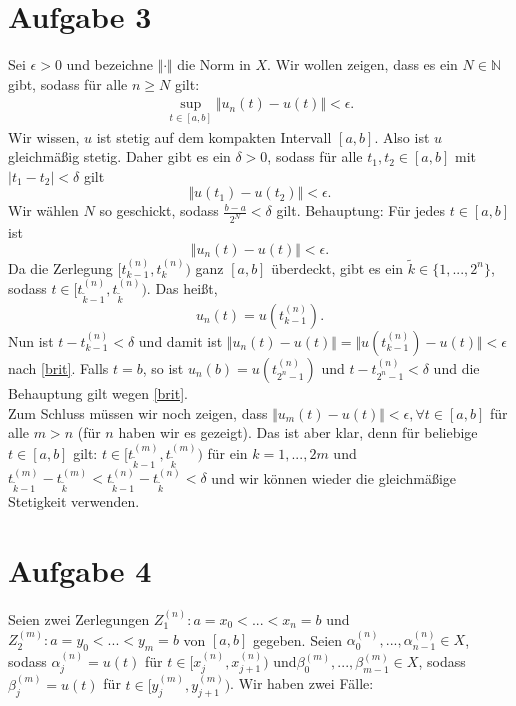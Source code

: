 \documentclass[a4paper,fontsize=8pt,DIV=1]{article}
\theoremstyle{plain}
\begin{document}
\section*{Aufgabe 3}
Sei $\epsilon > 0$ und bezeichne $\Vert \cdot \Vert$ die Norm in $X$. Wir wollen zeigen, dass es ein $N \in \mathbb N$ gibt, sodass für alle $n \geq N$ gilt:
\begin{align}\label{brit}
	\sup_{t \in [a,b]}\Vert u_n(t) - u(t) \Vert < \epsilon.
\end{align}
Wir wissen, $u$ ist stetig auf dem kompakten Intervall $[a,b]$. Also ist $u$ gleichmäßig stetig. Daher gibt es ein $\delta > 0$, sodass für alle $t_1,t_2 \in [a,b]$ mit $\vert t_1 - t_2 \vert < \delta$ gilt
\[
	\Vert u(t_1) - u(t_2) \Vert < \epsilon.
\]
Wir wählen $N$ so geschickt, sodass $\frac{b-a}{2^N} < \delta$ gilt. Behauptung: Für jedes $t \in [a,b]$ ist $$\Vert u_n(t) - u(t) \Vert < \epsilon.$$ Da die Zerlegung $[t_{k-1}^{(n)}, t_k^{(n)})$ ganz $[a,b]$ überdeckt, gibt es ein $\tilde k \in \{1,...,2^n\}$, sodass $t \in [t_{\tilde k-1}^{(n)}, t_{\tilde k}^{(n)})$. Das heißt,
\[
	u_n(t) = u(t_{k-1}^{(n)}).
\]
Nun ist $t - t_{k-1}^{(n)} < \delta$ und damit ist $\Vert u_n(t) - u(t) \Vert  = \Vert u(t_{k-1}^{(n)}) - u(t) \Vert < \epsilon$ nach \eqref{brit}. Falls $t = b$, so ist $u_n(b) = u(t_{2^n-1}^{(n)})$ und $t-t_{2^n-1}^{(n)} < \delta$ und die Behauptung gilt wegen \eqref{brit}. \\

Zum Schluss müssen wir noch zeigen, dass $\Vert u_m(t) - u(t) \Vert < \epsilon, \forall t \in [a,b]$ für alle $m > n$ (für $n$ haben wir es gezeigt). Das ist aber klar, denn für beliebige $t \in [a,b]$ gilt: $t \in [t_{\tilde k-1}^{(m)}, t_{\tilde k}^{(m)})$ für ein $k = 1,...,2m$ und $t_{\tilde k-1}^{(m)} - t_{\tilde k}^{(m)} < t_{\tilde k-1}^{(n)} - t_{\tilde k}^{(n)} < \delta$ und wir können wieder die gleichmäßige Stetigkeit verwenden.

\section*{Aufgabe 4}
Seien zwei Zerlegungen $Z_1^{(n)}: a= x_0 < ... < x_n = b$ und $Z_2^{(m)}: a = y_0 < ... < y_m = b$ von $[a,b]$ gegeben. Seien $\alpha_0^{(n)},...,\alpha_{n-1}^{(n)} \in X$, sodass $\alpha_j^{(n)} = u(t)$ für $t \in [x^{(n)}_{j},x^{(n)}_{j+1})$ und$ \beta_0^{(m)},...,\beta_{m-1}^{(m)} \in X$, sodass $\beta_j^{(m)} = u(t)$ für $t \in [y_{j}^{(m)},y_{j+1}^{(m)})$. Wir haben zwei Fälle:
\end{document}
